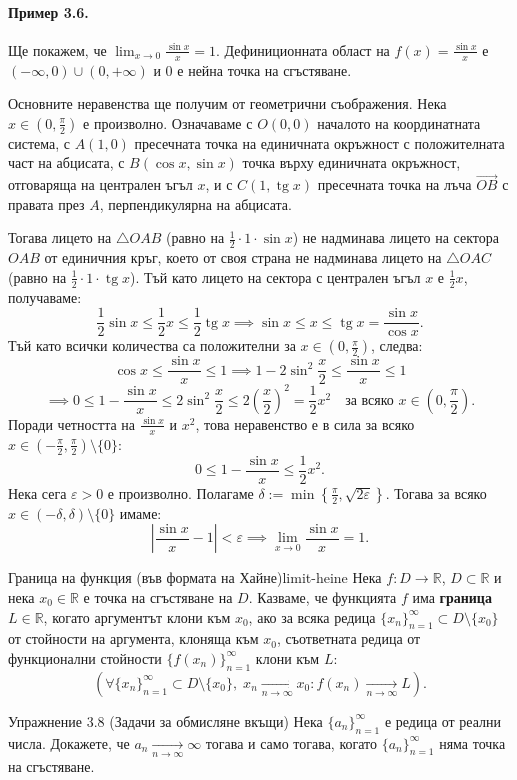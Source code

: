 \paragraph{Пример 3.6.}
Ще покажем, че $\lim_{x\to 0} \frac{\sin x}{x} = 1$. Дефиниционната област на $f(x) = \frac{\sin x}{x}$ е $(-\infty, 0) \cup (0, +\infty)$ и $0$ е нейна точка на сгъстяване.


Основните неравенства ще получим от геометрични съображения. Нека $x \in \left(0, \frac{\pi}{2}\right)$ е произволно. Означаваме с $O(0, 0)$ началото на координатната система, с $A(1, 0)$ пресечната точка на единичната окръжност с положителната част на абцисата, с $B(\cos x, \sin x)$ точка върху единичната окръжност, отговаряща на централен ъгъл $x$, и с $C(1, \operatorname{tg} x)$ пресечната точка на лъча $\vec{OB}$ с правата през $A$, перпендикулярна на абцисата.

Тогава лицето на $\triangle OAB$ (равно на $\frac{1}{2} \cdot 1 \cdot \sin x$) не надминава лицето на сектора $OAB$ от единичния кръг, което от своя страна не надминава лицето на $\triangle OAC$ (равно на $\frac{1}{2} \cdot 1 \cdot \operatorname{tg} x$). Тъй като лицето на сектора с централен ъгъл $x$ е $\frac{1}{2}x$, получаваме:
\[
\frac{1}{2} \sin x \le \frac{1}{2} x \le \frac{1}{2} \operatorname{tg} x \implies \sin x \le x \le \operatorname{tg} x = \frac{\sin x}{\cos x}.
\]
Тъй като всички количества са положителни за $x \in \left(0, \frac{\pi}{2}\right)$, следва:
\[
\cos x \le \frac{\sin x}{x} \le 1 \implies 1 - 2\sin^2 \frac{x}{2} \le \frac{\sin x}{x} \le 1
\]
\[
\implies 0 \le 1 - \frac{\sin x}{x} \le 2\sin^2 \frac{x}{2} \le 2\left(\frac{x}{2}\right)^2 = \frac{1}{2} x^2 \quad \text{за всяко } x \in \left(0, \frac{\pi}{2}\right).
\]
Поради четността на $\frac{\sin x}{x}$ и $x^2$, това неравенство е в сила за всяко $x \in \left(-\frac{\pi}{2}, \frac{\pi}{2}\right) \setminus \{0\}$:
\[
0 \le 1 - \frac{\sin x}{x} \le \frac{1}{2} x^2.
\]
Нека сега $\varepsilon > 0$ е произволно. Полагаме $\delta := \min\left\{\frac{\pi}{2}, \sqrt{2\varepsilon}\right\}$. Тогава за всяко $x \in (-\delta, \delta) \setminus \{0\}$ имаме:
\[
\left| \frac{\sin x}{x} - 1 \right| < \varepsilon \implies \lim_{x\to 0} \frac{\sin x}{x} = 1.
\]

\begin{definition}{Граница на функция (във формата на Хайне)}{limit-heine}
Нека $f \colon D \to \mathbb{R}$, $D \subset \mathbb{R}$ и нека $x_0 \in \mathbb{R}$ е точка на сгъстяване на $D$. Казваме, че функцията $f$ има \textbf{граница} $L \in \mathbb{R}$, когато аргументът клони към $x_0$, ако за всяка редица $\{x_n\}_{n=1}^{\infty} \subset D \setminus \{x_0\}$ от стойности на аргумента, клоняща към $x_0$, съответната редица от функционални стойности $\{f(x_n)\}_{n=1}^{\infty}$ клони към $L$:
\[
\left( \forall \{x_n\}_{n=1}^{\infty} \subset D \setminus \{x_0\}, \; x_n \xrightarrow[n\to\infty]{} x_0 \colon f(x_n) \xrightarrow[n\to\infty]{} L \right).
\]
\end{definition}

\begin{problembox}{Упражнение 3.8 (Задачи за обмисляне вкъщи)}
Нека $\{a_n\}_{n=1}^{\infty}$ е редица от реални числа. Докажете, че $a_n \xrightarrow[n\to\infty]{} \infty$ тогава и само тогава, когато $\{a_n\}_{n=1}^{\infty}$ няма точка на сгъстяване.
\end{problembox}